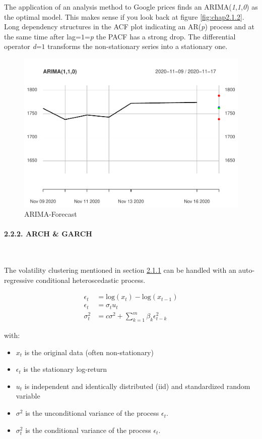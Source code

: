\documentclass[
]{article}
\providecommand{\tightlist}{%
  \setlength{\itemsep}{0pt}\setlength{\parskip}{0pt}}
\begin{document}
\newpage

The application of an analysis method to Google prices finds an
ARIMA(\emph{1},\emph{1},\emph{0}) as the optimal model. This makes sense
if you look back at figure \ref{fig:chap2.1.2}. Long dependency
structures in the ACF plot indicating an AR(\emph{p}) process and at the
same time after lag=\(1\)=\emph{p} the PACF has a strong drop. The
differential operator \emph{d}=\(1\) transforms the non-stationary
series into a stationary one.

\begin{figure}

{\centering \includegraphics[width=0.7\linewidth]{00_main_files/figure-latex/chap2.2.1-1} 

}

\caption{ARIMA-Forecast}\label{fig:chap2.2.1}
\end{figure}

\hypertarget{arch-garch-section}{%
\paragraph{2.2.2. ARCH \& GARCH}\label{arch-garch-section}}

~

The volatility clustering mentioned in section
\protect\hyperlink{stationarity}{2.1.1} can be handled with an
auto-regressive conditional heteroscedastic process.

\begin{align} \label{eq:arch}
  \epsilon_{t} &= \mathrm{log}(x_{t})-\mathrm{log}(x_{t-1}) \nonumber \\
  \epsilon_{t} &= \sigma_{t}u_{t} \\
  \sigma_{t}^{2} &=c \sigma^{2}+\sum_{k=1}^{m}\beta_{k}\epsilon_{t-k}^{2} \nonumber
\end{align}

with:

\begin{itemize}
\tightlist
\item
  \(x_{t}\) is the original data (often non-stationary)
\item
  \(\epsilon_{t}\) is the stationary log-return
\item
  \(u_{t}\) is independent and identically distributed (iid) and
  standardized random variable
\item
  \(\sigma^{2}\) is the unconditional variance of the process
  \(\epsilon_{t}\).
\item
  \(\sigma_{t}^{2}\) is the conditional variance of the process
  \(\epsilon_{t}\).
\end{itemize}
\end{document}
